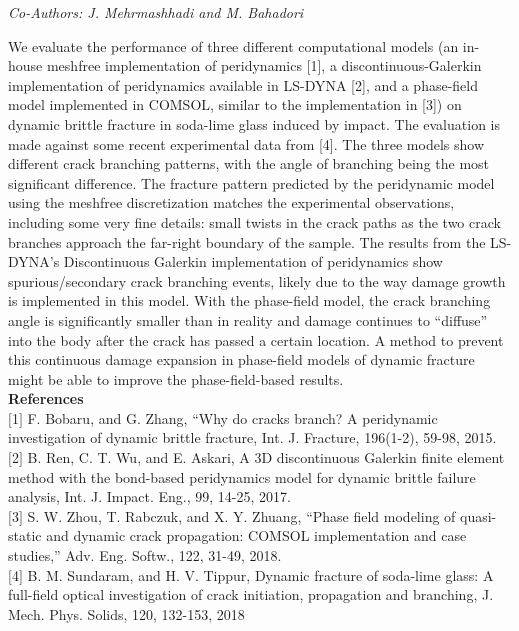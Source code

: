 \begin{center}
\textit{Co-Authors: J. Mehrmashhadi and M. Bahadori}
\end{center} 
We evaluate the performance of three different computational models (an in-house meshfree implementation of peridynamics [1], a discontinuous-Galerkin implementation of peridynamics available in LS-DYNA [2], and a phase-field model implemented in COMSOL, similar to the implementation in [3]) on dynamic brittle fracture in soda-lime glass induced by impact. The evaluation is made against some recent experimental data from [4]. The three models show different crack branching patterns, with the angle of branching being the most significant difference. The fracture pattern predicted by the peridynamic model using the meshfree discretization matches the experimental observations, including some very fine details: small twists in the crack paths as the two crack branches approach the far-right boundary of the sample. The results from the LS-DYNA’s Discontinuous Galerkin implementation of peridynamics show spurious/secondary crack branching events, likely due to the way damage growth is implemented in this model. With the phase-field model, the crack branching angle is significantly smaller than in reality and damage continues to “diffuse” into the body after the crack has passed a certain location. A method to prevent this continuous damage expansion in phase-field models of dynamic fracture might be able to improve the phase-field-based results.\\

\noindent\textbf{References}\\
$[$1$]$ F. Bobaru, and G. Zhang, “Why do cracks branch? A peridynamic investigation of dynamic brittle fracture, Int. J. Fracture, 196(1-2), 59-98, 2015. \\\newline
$[$2$]$ B. Ren, C. T. Wu, and E. Askari, A 3D discontinuous Galerkin finite element method with the bond-based peridynamics model for dynamic brittle failure analysis, Int. J. Impact. Eng., 99, 14-25, 2017.\\\newline 
$[$3$]$ S. W. Zhou, T. Rabczuk, and X. Y. Zhuang, “Phase field modeling of quasi-static and dynamic crack propagation: COMSOL implementation and case studies,” Adv. Eng. Softw., 122, 31-49, 2018. \\\newline
$[$4$]$ B. M. Sundaram, and H. V. Tippur, Dynamic fracture of soda-lime glass: A full-field optical investigation of crack initiation, propagation and branching, J. Mech. Phys. Solids, 120, 132-153, 2018
